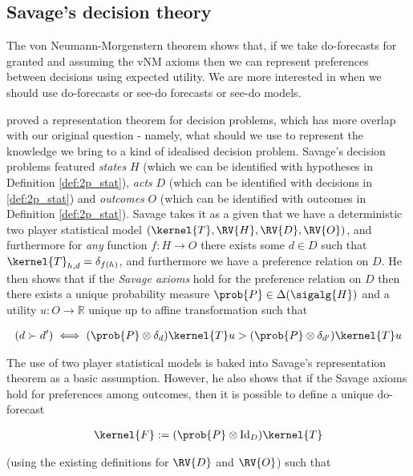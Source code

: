 
\subsection{Savage's decision theory}

The von Neumann-Morgenstern theorem shows that, if we take do-forecasts for granted and assuming the vNM axioms then we can represent preferences between decisions using expected utility. We are more interested in when we should use do-forecasts or see-do forecasts or see-do models. 

\citet{savage_foundations_1954} proved a representation theorem for decision problems, which has more overlap with our original question - namely, what should we use to represent the knowledge we bring to a kind of idealised decision problem. Savage's decision problems featured \emph{states} $H$ (which we can be identified with hypotheses in Definition \ref{def:2p_stat}), \emph{acts} $D$ (which can be identified with decisions in \ref{def:2p_stat}) and \emph{outcomes} $O$ (which can be identified with outcomes in Definition \ref{def:2p_stat}). Savage takes it as a given that we have a deterministic two player statistical model $(\kernel{T},\RV{H},\RV{D},\RV{O})$, and furthermore for \emph{any} function $f:H\to O$ there exists some $d\in D$ such that $\kernel{T}_{h,d} = \delta_{f(h)}$, and furthermore we have a preference relation on $D$. He then shows that if the \emph{Savage axioms} hold for the preference relation on $D$ then there exists a unique probability measure $\prob{P}\in \Delta(\sigalg{H})$ and a utility $u:O\to \mathbb{R}$ unique up to affine transformation such that

\begin{align}
(d\succ d')\iff (\prob{P}\otimes \delta_d)\kernel{T} u > (\prob{P}\otimes \delta_{d'})\kernel{T} u\label{eq:savage_utility}
\end{align}

The use of two player statistical models is baked into Savage's representation theorem as a basic assumption. However, he also shows that if the Savage axioms hold for preferences among outcomes, then it is possible to define a unique do-forecast

\begin{align}
    \kernel{F}:=(\prob{P}\otimes \mathrm{Id}_D)\kernel{T}
\end{align}

(using the existing definitions for $\RV{D}$ and $\RV{O}$) such that

